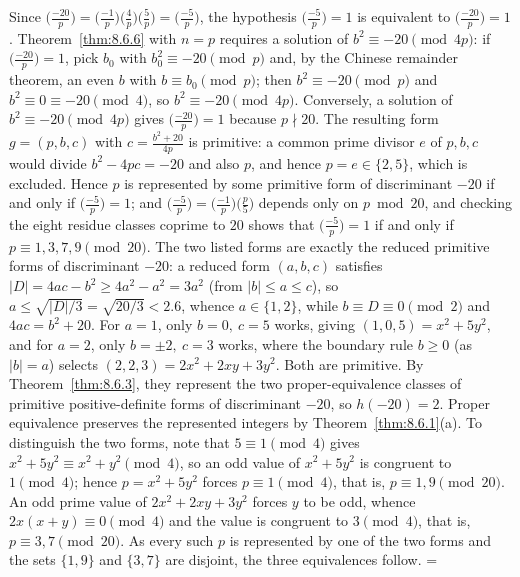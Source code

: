 \documentclass[11pt]{article}
\makeatletter
\theoremstyle{ntstyle}
\let\nt@closedisplay\]
\def\nt@guardedclose{\@ifnextchar\par{\nt@closeafterpar}{\@ifnextchar\end{\postdisplaypenalty\@M\nt@closedisplay}{\nt@closedisplay}}}
\def\nt@closeafterpar\par{\@ifnextchar\par{\nt@closeafterpar}{\@ifnextchar\end{\postdisplaypenalty\@M\nt@closedisplay\par}{\nt@closedisplay\par}}}
\renewenvironment{proof}[1][\proofname]{\par
  \pushQED{\qed}\normalfont\topsep\medskipamount\edef\nt@afterproof{\@endparpenalty=\the\@endparpenalty\relax}\@beginparpenalty\@M\@endparpenalty\@M\let\]\nt@guardedclose\trivlist\item[]\textit{#1\@addpunct{.}} \ignorespaces}{\ifvmode\addpenalty\@M\fi\popQED\nt@afterproof\endtrivlist\@endpefalse}
\newcommand{\legs}[2]{\bigl(\tfrac{#1}{#2}\bigr)}
\makeatother
\begin{document}
\begin{proof} Since $\legs{-20}{p} =
		\legs{-1}{p}\legs{4}{p}\legs{5}{p}
		= \legs{-5}{p}$, the hypothesis $\legs{-5}{p} = 1$ is equivalent to
	$\legs{-20}{p} = 1$. Theorem~\ref{thm:8.6.6} with $n = p$ requires a solution of
	$b^{2} \equiv -20 \pmod{4p}$: if $\legs{-20}{p} = 1$, pick $b_0$ with
	$b_0^{2} \equiv -20 \pmod{p}$ and, by the Chinese remainder theorem,
	an even $b$ with $b \equiv b_0 \pmod{p}$; then $b^{2} \equiv -20
		\pmod{p}$ and $b^{2} \equiv 0 \equiv -20 \pmod{4}$, so $b^{2} \equiv
		-20 \pmod{4p}$. Conversely, a solution of $b^{2} \equiv -20 \pmod{4p}$
	gives $\legs{-20}{p} = 1$ because $p \nmid 20$. The resulting form
	$g = (p, b, c)$ with $c = \tfrac{b^{2}+20}{4p}$ is primitive: a common
	prime divisor $e$ of $p, b, c$ would divide $b^{2} - 4pc = -20$ and
	also $p$, and hence $p = e \in \{2, 5\}$, which is excluded. Hence $p$ is
	represented by some primitive form of discriminant $-20$ if and only if
	$\legs{-5}{p} = 1$; and $\legs{-5}{p} =
		\legs{-1}{p}\legs{p}{5}$ depends only on
	$p \bmod 20$, and checking the eight residue classes coprime to $20$ shows that
	$\legs{-5}{p} = 1$ if and only if $p \equiv 1, 3, 7, 9 \pmod{20}$.
	The two listed forms are exactly the reduced primitive forms of
	discriminant $-20$: a reduced form $(a,b,c)$ satisfies $|D| = 4ac - b^2 \ge 4a^2 - a^2 = 3a^2$
	(from $|b| \le a \le c$), so $a \le
		\sqrt{|D|/3} = \sqrt{20/3} < 2.6$, whence $a \in \{1,
		2\}$, while $b \equiv D \equiv 0 \pmod{2}$ and $4ac = b^{2} + 20$. For
	$a = 1$, only $b = 0,\ c = 5$ works, giving $(1, 0, 5) = x^{2} +
		5y^{2}$, and for $a = 2$, only $b = \pm 2,\ c = 3$ works, where the
	boundary rule $b \ge 0$ (as $|b| = a$) selects $(2, 2, 3) = 2x^{2} +
		2xy + 3y^{2}$. Both are primitive. By Theorem~\ref{thm:8.6.3}, they represent the two
	proper-equivalence classes of primitive positive-definite forms of
	discriminant $-20$, so $h(-20)=2$. Proper equivalence preserves the
	represented integers by Theorem~\ref{thm:8.6.1}(a).
	To distinguish the two forms, note that $5 \equiv 1 \pmod{4}$ gives $x^{2} + 5y^{2}
		\equiv x^{2} + y^{2} \pmod{4}$, so an odd value of $x^{2} + 5y^{2}$ is
	congruent to $1 \pmod{4}$; hence $p = x^{2} + 5y^{2}$ forces $p \equiv 1
		\pmod{4}$, that is, $p \equiv 1, 9 \pmod{20}$. An odd prime value of
	$2x^{2} + 2xy + 3y^{2}$ forces $y$ to be odd, whence $2x(x + y) \equiv 0
		\pmod{4}$ and the value is congruent to $3 \pmod{4}$, that is, $p \equiv 3, 7
		\pmod{20}$. As every such $p$ is represented by one of the two forms
	and the sets $\{1, 9\}$ and $\{3, 7\}$ are disjoint, the three equivalences
	follow.
\end{proof}
\end{document}
